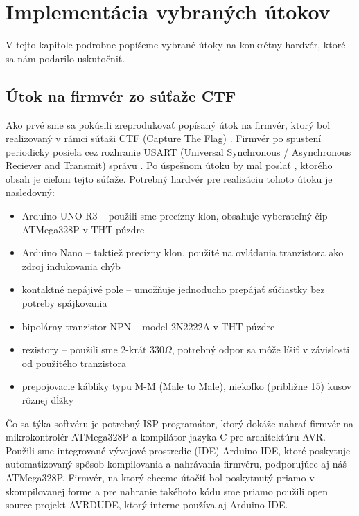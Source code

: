 \chapter{Implementácia vybraných útokov}

\label{kap:implementacia} %

V tejto kapitole podrobne popíšeme vybrané útoky na konkrétny hardvér, ktoré sa nám podarilo uskutočniť.

\section{Útok na firmvér zo súťaže CTF}
Ako prvé sme sa pokúsili zreprodukovať popísaný útok na firmvér, ktorý bol realizovaný v rámci súťaži CTF (Capture The Flag) \cite{vccOnTheCheap}. Firmvér po spustení periodicky posiela cez rozhranie USART (Universal Synchronous / Asynchronous Reciever and Transmit) správu . Po úspešnom útoku by mal poslať , ktorého obsah je cieľom tejto súťaže. Potrebný hardvér pre realizáciu tohoto útoku je nasledovný:
\begin{itemize}
    \item Arduino UNO R3 -- použili sme precízny klon, obsahuje vyberateľný čip ATMega328P v THT púzdre
    \item Arduino Nano -- taktiež precízny klon, použité na ovládania tranzistora ako zdroj indukovania chýb
    \item kontaktné nepájivé pole -- umožňuje jednoducho prepájať súčiastky bez potreby spájkovania
    \item bipolárny tranzistor NPN -- model 2N2222A v THT púzdre
    \item rezistory -- použili sme 2-krát 330$\Omega$, potrebný odpor sa môže líšiť v závislosti od použitého tranzistora
    \item prepojovacie kábliky typu M-M (Male to Male), niekoľko (približne 15) kusov rôznej dĺžky
\end{itemize}
Čo sa týka softvéru je potrebný ISP programátor, ktorý dokáže nahrať firmvér na mikrokontrolér ATMega328P a kompilátor jazyka C pre architektúru AVR. Použili sme integrované vývojové prostredie (IDE) Arduino IDE, ktoré poskytuje automatizovaný spôsob kompilovania a nahrávania firmvéru, podporujúce aj náš ATMega328P. Firmvér, na ktorý chceme útočiť bol poskytnutý priamo v skompilovanej forme a pre nahranie takéhoto kódu sme priamo použili open source projekt AVRDUDE, ktorý interne používa aj Arduino IDE.


